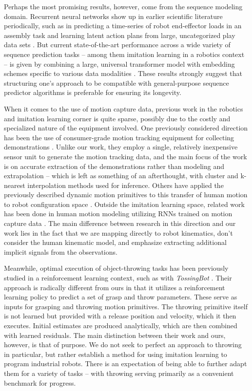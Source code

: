\documentclass{article}
\begin{document}
Perhaps the most promising results, however, come from the sequence modeling domain. Recurrent neural networks show up in earlier scientific literature periodically, such as in predicting a time-series of robot end-effector loads in an assembly task \citep{scherzinger2019contact} and learning latent action plans from large, uncategorized play data sets \citep{lynch2020learning}. But current state-of-the-art performance across a wide variety of sequence prediction tasks -- among them imitation learning in a robotics context -- is given by combining a large, universal transformer model with embedding schemes specific to various data modalities \citep{reed2022generalist}. These results strongly suggest that structuring one's approach to be compatible with general-purpose sequence predictor algorithms is preferable for ensuring its longevity.

When it comes to the use of motion capture data, previous work in the robotics and imitation learning corner is quite sparse, possibly due to the costly and specialized nature of the equipment involved. One previously considered direction has been the use of consumer-grade motion tracking equipment for collecting demonstrations \citep{jha2017imitation}. Unlike our work, they employ a single, relatively inexpensive sensor unit to generate the motion tracking data, and the main focus of the work is on accurate extraction of the demonstrations rather than modeling and extrapolation -- which is left as something of an afterthought, with cluster and k-nearest interpolation methods used for inference. Others have applied the previously described dynamic motion primitives to this transfer of human motion to robot configuration space \citep{vuga2013mocap}. Outside the imitation learning space, related work has been done in human motion modeling utilizing RNNs trained on motion capture data \citep{Fragkiadaki_2015_ICCV,pavllo2018quaternet}. The main difference between research in this direction and our work lies in the fact that we are mapping directly to robot kinematics, don't consider the human kinematic model, and emphasize extracting additional implicit signals from the observations. 

Meanwhile, optimal execution of object-throwing tasks has been previously studied in a reinforcement learning context, such as with \emph{TossingBot} \citep{zeng2020tossingbot}. Their approach is radically different from ours in that it utilizes a reinforcement learning policy to predict a set of grasp and throw parameters. These serve as inputs for grasping and throwing motion primitives. The throwing primitive itself is not learned but provided with a release position and velocity, which it then executes. Initial estimates are produced analytically, which are then combined with learned residuals. The main distinction between their work and ours, however, is that of purpose. We do not seek to perfect an approach to throwing in particular, but rather establish a method for using imitation learning to program industrial robots. There is an expectation of being able to further adapt them for a variety of tasks -- with throwing serving primarily as a convenient benchmark for progress.
\end{document}
